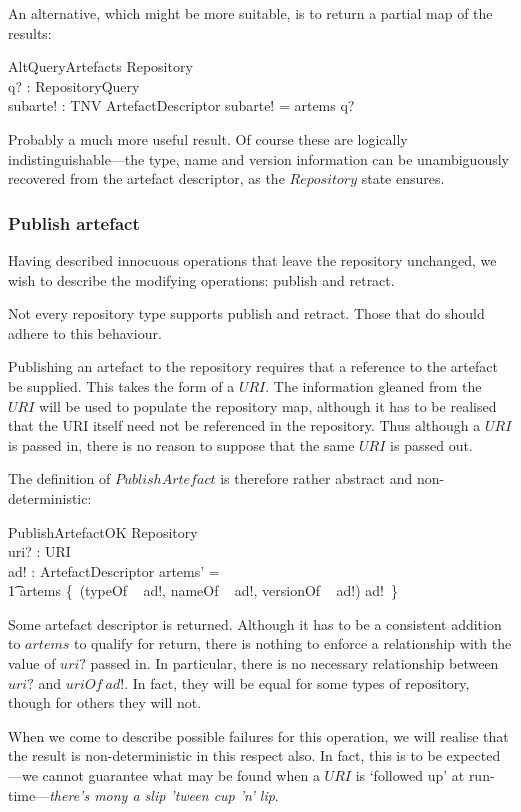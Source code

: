 \documentclass[a4paper,titlepage,twoside,12pt]{article}
\begin{document}
An alternative, which might be more suitable, is to return a partial map of the results:
\begin{schema}{AltQueryArtefacts}
	\Xi Repository	\\
	q? : RepositoryQuery	\\
	subarte! : TNV \finj ArtefactDescriptor
\where
	subarte! = artems \rres q? 
\end{schema}
Probably a much more useful result. Of course these are logically in\-dis\-tinguish\-able---the type, name and version information can be unambiguously recovered from the artefact descriptor, as the $Repository$ state ensures.

\subsubsection{Publish artefact}
Having described innocuous operations that leave the repository unchanged, we wish to describe the modifying operations: publish and retract.

Not every repository type supports publish and retract. Those that do should adhere to this behaviour.

Publishing an artefact to the repository requires that a reference to the artefact be supplied. This takes the form of a $URI$. The information gleaned from the $URI$ will be used to populate the repository map, although it has to be realised that the URI itself need not be referenced in the repository. Thus although a $URI$ is passed in, there is no reason to suppose that the same $URI$ is passed out.

The definition of $PublishArtefact$ is therefore rather abstract and non-deterministic:
\begin{schema}{PublishArtefactOK}
	\Delta Repository	\\
	uri? : URI	\\
	ad! : ArtefactDescriptor
\where
	artems' = \\
	\t1	artems \oplus \{~(typeOf ~ ad!, nameOf ~ ad!, versionOf ~ ad!) \mapsto ad!~\}
\end{schema}
Some artefact descriptor is returned. Although it has to be a consistent addition to $artems$ to qualify for return, there is nothing to enforce a relationship with the value of $uri?$ passed in. In particular, there is no necessary relationship between $uri?$ and $uriOf ~ ad!$. In fact, they will be equal for some types of repository, though for others they will not.

When we come to describe possible failures for this operation, we will realise that the result is non-deterministic in this respect also. In fact, this is to be expected---we cannot guarantee what may be found when a $URI$ is `followed up' at run-time---\emph{there's mony a slip 'tween cup 'n' lip}.
\end{document}
